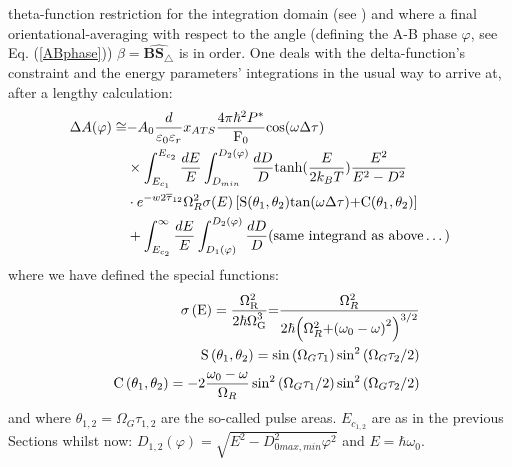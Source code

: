 \documentclass[10pt]{article}
\begin{document}
theta-function restriction for the integration domain (see \cite{Pal2011}) and 
where a final orientational-averaging with respect to the angle (defining the A-B 
phase $\varphi$, see Eq. (\ref{ABphase}))
$\beta =\widehat{{\mathbf B}{{\mathbf S}}_{\triangle }}$ is in order. 
One deals with the delta-function's constraint and the energy parameters' integrations 
in the usual way to arrive at, after a lengthy calculation:
\begin{equation}
\begin{split}
\Delta A(\varphi)\cong & {-A}_0\frac{d}{{\varepsilon }_0{\varepsilon }_r}x_{ATS}\frac{4\pi {\hbar }^2P^*}{{{\rm F}}_0}{\cos (\omega \Delta \tau) }\\
& \times \int^{E_{c_2}}_{E_{c_1}}{\frac{dE}{E}}\int^{D_2(\varphi)}_{D_{min}}{\frac{dD}{D}{\tanh (\frac{E}{2k_{B}T})}\frac{E^2}{E^2-D^2}}\\
& \cdot e^{-w2{\overline{\tau }}_{12}}{\Omega }^{2}_R\sigma (E)\left[{\rm S}({\theta }_{{1}},{\theta }_{{2}}){\tan (\omega \Delta \tau)}{\rm +C}({\theta }_{{1}},{\theta }_{{2}})\right] \\  
&+\int^{\infty }_{E_{c_2}}{\frac{dE}{E}}\int^{D_2(\varphi)}_{D_1(\varphi)}{\frac{dD}{D}}({\rm same~integrand~as~above}\dots ) \\
\end{split}
\label{eq933}
\end{equation}
where we have defined the special functions:
\begin{eqnarray}
&&\sigma \left({\rm E}\right)=\frac{{\Omega }^{{\rm 2}}_{{\rm R}}}{{{\rm 2}\hbar\Omega }^{{\rm 3}}_{{\rm G}}}{\rm =}\frac{{\Omega }^{{\rm 2}}_R}{{\rm 2}\hbar {\left({\Omega }^{{\rm 2}}_R{\rm +}{{\rm (}{\omega }_0-\omega {\rm )}}^{{\rm 2}}\right)}^{{\rm 3/2}}}  \nonumber \\
&&{\rm S}\left({\theta }_{{\rm 1}},{\theta }_{{\rm 2}}\right)=\sin \left(\Omega_G\tau_1\right) \sin^2\left(\Omega_G\tau_2/2\right) \\
&&{\rm C}\left(\theta_1,\theta_2\right)=-2\frac{\omega_0-\omega}{\Omega_R}\sin ^2\left(\Omega_G \tau_1/2\right)\sin ^2\left(\Omega_G \tau_2/2\right) \nonumber 
\label{eq934}
\end{eqnarray}
and where $\theta_{1,2}=\Omega_G\tau_{1,2}$ are the so-called pulse areas. 
$E_{c_{1,2}}$ are as in the previous Sections whilst now: 
$D_{1,2}\left(\varphi\right)=\sqrt{E^2-D^2_{0max,min}\varphi^2}$ 
and $E={\hbar \omega }_0$.
\end{document}
